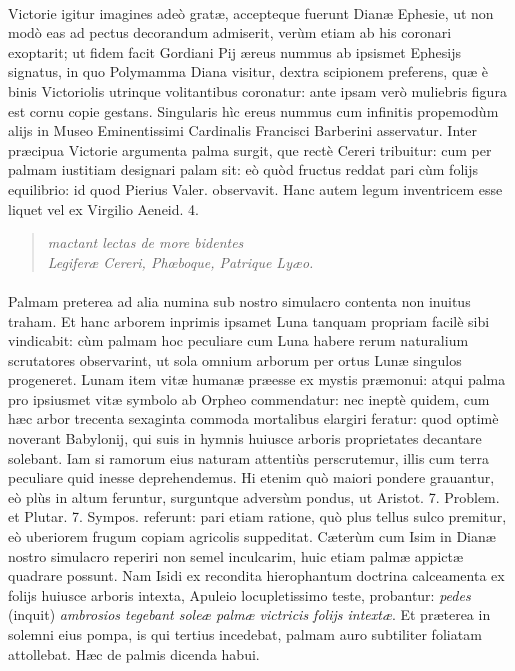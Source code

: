 \documentclass[a4paper, 11pt, oneside, polutonikogreek, latin]{article}
\begin{document}
\paragraph{}
Victorie igitur imagines adeò gratæ, accepteque fuerunt Dianæ Ephesie, ut non modò eas ad pectus decorandum admiserit, verùm etiam ab his
coronari exoptarit; ut fidem facit Gordiani Pij æreus nummus ab ipsismet Ephesijs signatus, in quo Polymamma Diana visitur, dextra scipionem preferens, quæ è binis Victoriolis utrinque volitantibus coronatur: ante ipsam verò muliebris figura est cornu copie gestans. Singularis hìc ereus nummus cum infinitis propemodùm alijs in Museo Eminentissimi Cardinalis Francisci Barberini asservatur. Inter præcipua Victorie argumenta palma surgit, que rectè Cereri tribuitur: cum per palmam iustitiam designari palam sit: eò quòd fructus reddat pari cùm folijs equilibrio: id quod Pierius Valer. observavit. Hanc autem legum inventricem esse liquet vel ex Virgilio Aeneid. 4.
\begin{quote}
\hspace*{15mm}\emph{mactant lectas de more bidentes}\\
\emph{Legiferæ Cereri, Phœboque, Patrique Lyæo.}\\
\end{quote}
\vspace*{-8mm}
\paragraph{}
Palmam preterea ad alia numina sub nostro simulacro contenta non inuitus traham. Et hanc arborem inprimis ipsamet Luna tanquam propriam facilè sibi vindicabit: cùm palmam hoc peculiare cum Luna habere rerum naturalium scrutatores observarint, ut sola omnium arborum per ortus Lunæ singulos progeneret. Lunam item vitæ humanæ præesse ex mystis præmonui: atqui palma pro ipsiusmet vitæ symbolo ab Orpheo commendatur: nec ineptè quidem, cum hæc arbor trecenta sexaginta commoda mortalibus elargiri feratur: quod optimè noverant Babylonij, qui suis in hymnis huiusce arboris proprietates decantare solebant. Iam si ramorum eius naturam attentiùs perscrutemur, illis cum terra peculiare quid inesse deprehendemus. Hi etenim quò maiori pondere grauantur, eò plùs in altum feruntur, surguntque adversùm pondus, ut Aristot. 7. Problem. et Plutar. 7. Sympos. referunt: pari etiam ratione, quò plus tellus sulco premitur, eò uberiorem frugum copiam agricolis suppeditat. Cæterùm cum Isim in Dianæ nostro simulacro reperiri non semel inculcarim, huic etiam palmæ appictæ quadrare possunt. Nam Isidi ex recondita hierophantum doctrina calceamenta ex folijs huiusce arboris intexta, Apuleio locupletissimo teste, probantur: \emph{pedes} (inquit) \emph{ambrosios tegebant soleæ palmæ victricis folijs intextæ}. Et præterea in solemni eius pompa, is qui tertius incedebat, palmam auro subtiliter foliatam attollebat. Hæc de palmis dicenda habui.
\clearpage
\end{document}
